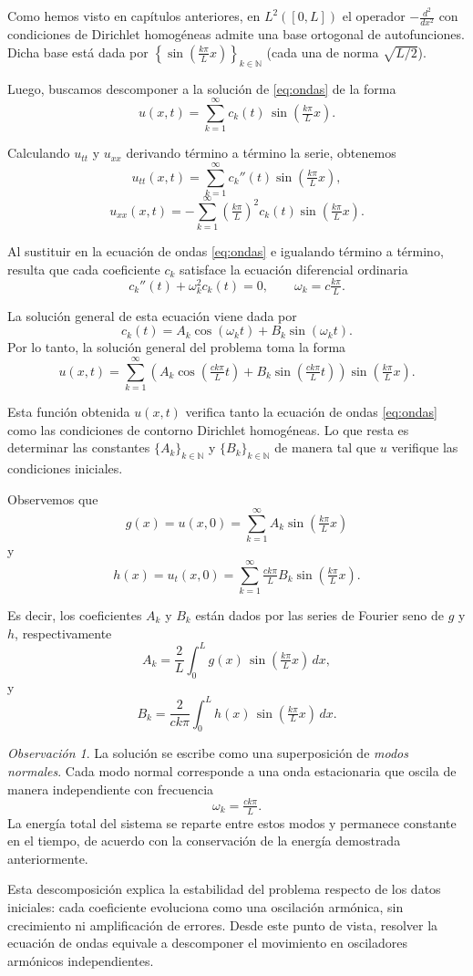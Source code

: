 \documentclass[12pt, a4paper]{amsbook}
\newcommand{\N}{{\mathbb N}}
\theoremstyle{remark}
\newtheorem{obs}[teo]{Observación}
\theoremstyle{definition}
\numberwithin{section}{chapter}
\numberwithin{subsection}{section}
\numberwithin{equation}{section}
\numberwithin{figure}{chapter}
\begin{document}
Como hemos visto en capítulos anteriores, en $L^2([0,L])$ el operador $-\frac{d^2}{dx^2}$ con condiciones de Dirichlet homogéneas admite una base ortogonal de autofunciones. Dicha base está dada por $\left\{\sin(\tfrac{k\pi}{L}x)\right\}_{k\in\N}$ (cada una de norma $\sqrt{L/2}$).

Luego, buscamos descomponer a la solución de \eqref{eq:ondas} de la forma
\[
u(x,t)=\sum_{k=1}^{\infty} c_k(t)\,\sin(\tfrac{k\pi }{L}x).
\]

Calculando $u_{tt}$ y $u_{xx}$ derivando término a término la serie, obtenemos
\[
u_{tt}(x,t)
=
\sum_{k=1}^{\infty} c_k''(t) \sin(\tfrac{k\pi}{L}x),
\]
\[
u_{xx}(x,t)
=
-\sum_{k=1}^{\infty}
\left(\tfrac{k\pi}{L}\right)^2 c_k(t)
\sin(\tfrac{k\pi}{L}x).
\]

Al sustituir en la ecuación de ondas \eqref{eq:ondas} e igualando término a término, resulta que cada coeficiente $c_k$ satisface la ecuación diferencial ordinaria
\[
c_k''(t)
+
\omega_k^2 c_k(t)=0,
\qquad
\omega_k = c \tfrac{k\pi}{L}.
\]

La solución general de esta ecuación viene dada por
\[
c_k(t)
=
A_k \cos(\omega_k t)
+
B_k \sin(\omega_k t).
\]
Por lo tanto, la solución general del problema toma la forma
\[
u(x,t)
=
\sum_{k=1}^{\infty}
\left(
A_k \cos(\tfrac{ck\pi}{L} t)
+
B_k \sin(\tfrac{ck\pi}{L} t)
\right)
\sin(\tfrac{k\pi}{L}x).
\]

Esta función obtenida $u(x,t)$ verifica tanto la ecuación de ondas \eqref{eq:ondas} como las condiciones de contorno Dirichlet homogéneas. Lo que resta es determinar las constantes $\{A_k\}_{k\in\N}$ y $\{B_k\}_{k\in\N}$ de manera tal que $u$ verifique las condiciones iniciales.

Observemos que
\[
g(x)
= u(x, 0) =
\sum_{k=1}^{\infty}
A_k
\sin(\tfrac{k\pi}{L}x)
\]
y
\[
h(x)
= u_t(x,0) =
\sum_{k=1}^{\infty}
\tfrac{ck\pi}{L} B_k
\sin(\tfrac{k\pi}{L}x).
\]

Es decir, los coeficientes $A_k$ y $B_k$ están dados por las series de Fourier seno de $g$ y $h$, respectivamente
\[
A_k
=
\frac{2}{L}
\int_0^L
g(x)\,
\sin(\tfrac{k\pi}{L}x)\,dx,
\]
y
\[
B_k
=
\frac{2}{ck\pi}
\int_0^L
h(x)\,
\sin(\tfrac{k\pi}{L}x)\,dx.
\]

\begin{obs}
La solución se escribe como una superposición de \emph{modos normales}.
Cada modo normal corresponde a una onda estacionaria que oscila de manera
independiente con frecuencia
\[
\omega_k = \tfrac{ck\pi}{L}.
\]
La energía total del sistema se reparte entre estos modos y permanece constante
en el tiempo, de acuerdo con la conservación de la energía demostrada anteriormente.

Esta descomposición explica la estabilidad del problema respecto de los datos
iniciales: cada coeficiente evoluciona como una oscilación armónica, sin
crecimiento ni amplificación de errores. Desde este punto de vista, resolver la ecuación de ondas equivale a descomponer el movimiento en osciladores armónicos independientes.
\end{obs}
\end{document}
